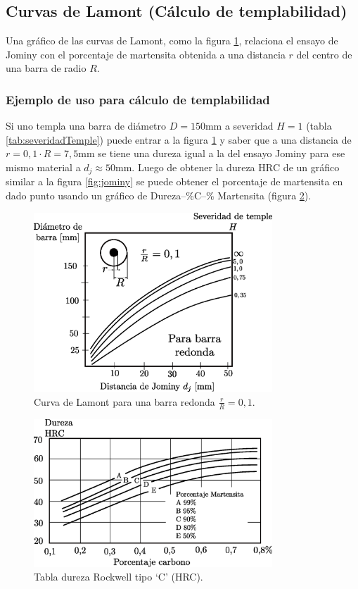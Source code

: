 \documentclass{article}
\newcommand{\HRC}{\ensuremath{\mathrm{HRC}}}
\begin{document}
\subsection{Curvas de Lamont (Cálculo de templabilidad)}
Una gráfico de las curvas de Lamont, como la figura \ref{fig:lamont}, relaciona el ensayo de Jominy con el porcentaje de martensita obtenida a una distancia $r$ del centro de una barra de radio $R$. 

\subsubsection{Ejemplo de uso para cálculo de templabilidad}
 Si uno templa una barra de diámetro $D=150$mm a severidad $H=1$ (tabla \ref{tab:severidadTemple}) puede entrar a la figura \ref{fig:lamont} y saber que a una distancia de $r=0,1\cdot R=7,5$mm se tiene una dureza igual a la del ensayo Jominy para ese mismo material a $d_j\approx50$mm. Luego de obtener la dureza \HRC{} de un gráfico similar a la figura \ref{fig:jominy} se puede obtener el porcentaje de martensita en dado punto usando un gráfico de Dureza--\%C--\% Martensita (figura \ref{fig:rockewell}).
 
 

\begin{figure}[htb!]
    \centering
    \includegraphics[width=0.8\textwidth]{fig/lamont.eps}
    \caption{Curva de Lamont para una barra redonda $\frac{r}{R}=0,1$.}
    \label{fig:lamont}
\end{figure}


\begin{figure}[htb!]
    \centering
    \includegraphics[width=0.8\textwidth]{fig/HRCdiag.eps}
    \caption{Tabla dureza Rockwell tipo `C' (HRC).}
    \label{fig:rockewell}
\end{figure}
\end{document}
